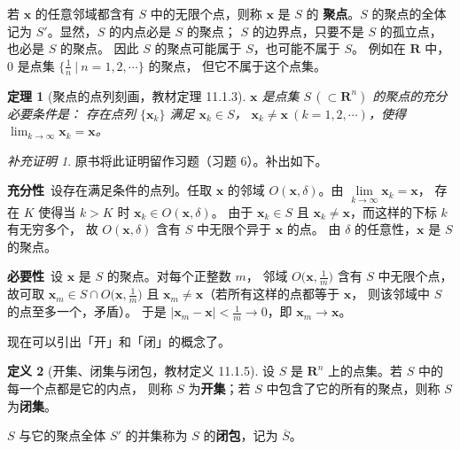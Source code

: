 \documentclass[11pt]{ctexart}
\theoremstyle{plain}
\newtheorem{thm}{定理}[section]
\theoremstyle{definition}
\newtheorem{defn}[thm]{定义}
\theoremstyle{remark}
\newtheorem*{completion}{补充证明}
\begin{document}
若 \(\boldsymbol{x}\) 的任意邻域都含有 \(S\) 中的无限个点，则称 \(\boldsymbol{x}\) 是 \(S\) 的
\textbf{聚点}。\(S\) 的聚点的全体记为 \(S'\)。显然，\(S\) 的内点必是 \(S\) 的聚点；
\(S\) 的边界点，只要不是 \(S\) 的孤立点，也必是 \(S\) 的聚点。
因此 \(S\) 的聚点可能属于 \(S\)，也可能不属于 \(S\)。
例如在 \(\mathbf{R}\) 中，\(0\) 是点集 \(\bigl\{\tfrac{1}{n}\ \big|\ n=1,2,\cdots\bigr\}\) 的聚点，
但它不属于这个点集。

\begin{thm}[聚点的点列刻画，教材定理 11.1.3]\label{thm:cluster}
\(\boldsymbol{x}\) 是点集 \(S\,(\subset\mathbf{R}^n)\) 的聚点的充分必要条件是：
存在点列 \(\{\boldsymbol{x}_k\}\) 满足 \(\boldsymbol{x}_k\in S\)，
\(\boldsymbol{x}_k\neq\boldsymbol{x}\ (k=1,2,\cdots)\)，使得
\(\displaystyle\lim_{k\to\infty}\boldsymbol{x}_k=\boldsymbol{x}\)。
\end{thm}

\begin{completion}
原书将此证明留作习题（习题 6）。补出如下。

\textbf{充分性}\ 设存在满足条件的点列。任取 \(\boldsymbol{x}\) 的邻域
\(O(\boldsymbol{x},\delta)\)。由 \(\lim\limits_{k\to\infty}\boldsymbol{x}_k=\boldsymbol{x}\)，
存在 \(K\) 使得当 \(k>K\) 时 \(\boldsymbol{x}_k\in O(\boldsymbol{x},\delta)\)。
由于 \(\boldsymbol{x}_k\in S\) 且 \(\boldsymbol{x}_k\neq\boldsymbol{x}\)，而这样的下标 \(k\) 有无穷多个，
故 \(O(\boldsymbol{x},\delta)\) 含有 \(S\) 中无限个异于 \(\boldsymbol{x}\) 的点。
由 \(\delta\) 的任意性，\(\boldsymbol{x}\) 是 \(S\) 的聚点。

\textbf{必要性}\ 设 \(\boldsymbol{x}\) 是 \(S\) 的聚点。对每个正整数 \(m\)，
邻域 \(O\bigl(\boldsymbol{x},\tfrac{1}{m}\bigr)\) 含有 \(S\) 中无限个点，
故可取 \(\boldsymbol{x}_m\in S\cap O\bigl(\boldsymbol{x},\tfrac{1}{m}\bigr)\) 且
\(\boldsymbol{x}_m\neq\boldsymbol{x}\)（若所有这样的点都等于 \(\boldsymbol{x}\)，
则该邻域中 \(S\) 的点至多一个，矛盾）。
于是 \(|\boldsymbol{x}_m-\boldsymbol{x}|<\tfrac{1}{m}\to 0\)，即
\(\boldsymbol{x}_m\to \boldsymbol{x}\)。
\end{completion}

现在可以引出「开」和「闭」的概念了。

\begin{defn}[开集、闭集与闭包，教材定义 11.1.5]\label{def:openset}
设 \(S\) 是 \(\mathbf{R}^n\) 上的点集。若 \(S\) 中的每一个点都是它的内点，
则称 \(S\) 为\textbf{开集}；若 \(S\) 中包含了它的所有的聚点，则称 \(S\) 为\textbf{闭集}。

\(S\) 与它的聚点全体 \(S'\) 的并集称为 \(S\) 的\textbf{闭包}，记为 \(\overline{S}\)。
\end{defn}
\end{document}
